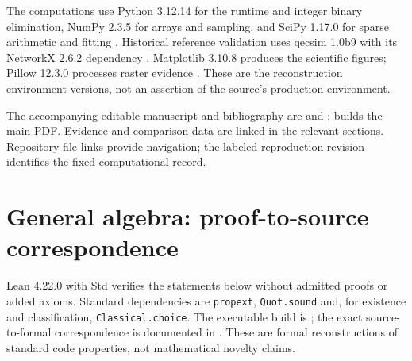 The computations use Python 3.12.14 for the runtime and integer binary elimination, NumPy 2.3.5 for arrays and sampling, and SciPy 1.17.0 for sparse arithmetic and fitting \citep{python,numpy,scipy}. Historical reference validation uses qecsim 1.0b9 with its NetworkX 2.6.2 dependency \citep{qecsim,networkx}. Matplotlib 3.10.8 produces the scientific figures; Pillow 12.3.0 processes raster evidence \citep{matplotlib,pillow}. These are the reconstruction environment versions, not an assertion of the source's production environment.

The accompanying editable manuscript and bibliography are  and ;  builds the main PDF. Evidence and comparison data are linked in the relevant sections. Repository file links provide navigation; the labeled reproduction revision identifies the fixed computational record.

\section{General algebra: proof-to-source correspondence}
Lean 4.22.0 with Std verifies the statements below without admitted proofs or added axioms. Standard dependencies are \texttt{propext}, \texttt{Quot.sound} and, for existence and classification, \texttt{Classical.choice}. The executable build is ; the exact source-to-formal correspondence is documented in . These are formal reconstructions of standard code properties, not mathematical novelty claims.

